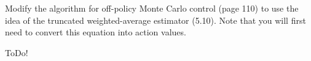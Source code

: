 
\begin{exercise}

Modify the algorithm for off-policy Monte Carlo control (page 110) to use the idea of the truncated weighted-average estimator (5.10). Note that you will first need to convert this equation into action values.

\end{exercise}


\begin{solution}

ToDo!

\end{solution}


